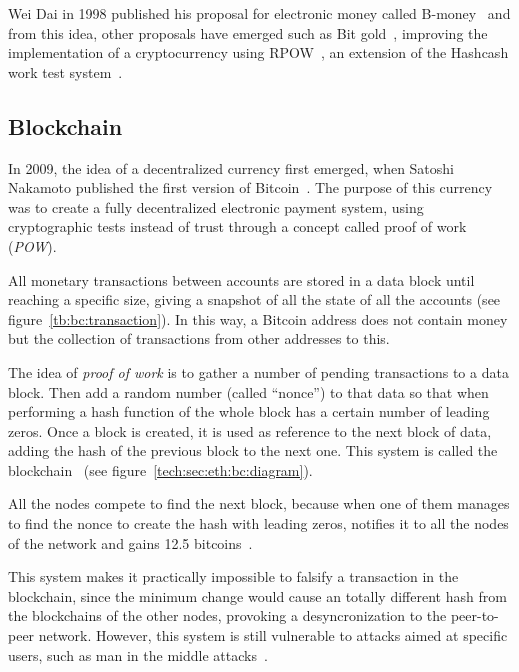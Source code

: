 Wei Dai in 1998 published his proposal for electronic money called
B-money~\cite{bmoney} and from this idea, other proposals have emerged such as
Bit gold~\cite{bitgold}, improving the implementation of a cryptocurrency using
RPOW~\cite{finney2005rpow}, an extension of the Hashcash work test
system~\cite{back2002hashcash}.

\subsection{Blockchain}
\label{tb:bc}


In 2009, the idea of a decentralized currency first emerged, when Satoshi
Nakamoto published the first version of Bitcoin~\cite{nakamoto2008bitcoin}. The
purpose of this currency was to create a fully decentralized electronic payment
system, using cryptographic tests instead of trust through a concept called
proof of work (\emph{POW}).

All monetary transactions between accounts are stored in a data block until
reaching a specific size, giving a snapshot of all the state of all the accounts
(see figure~\ref{tb:bc:transaction}). In this way, a Bitcoin address does not
contain money but the collection of transactions from other addresses to this.

The idea of \emph{proof of work} is to gather a number of pending transactions
to a data block. Then add a random number (called ``nonce'') to that data so
that when performing a hash function of the whole block has a certain number of
leading zeros. Once a block is created, it is used as reference to the next
block of data, adding the hash of the previous block to the next one. This
system is called the blockchain~\cite{antonopoulos2014mastering} (see
figure~\ref{tech:sec:eth:bc:diagram}).


All the nodes compete to find the next block, because when one of them manages
to find the nonce to create the hash with leading zeros, notifies it to all the
nodes of the network and gains 12.5 bitcoins~\cite{barber2012bitter}.

This system makes it practically impossible to falsify a transaction in the
blockchain, since the minimum change would cause an totally different hash from
the blockchains of the other nodes, provoking a desyncronization to the
peer-to-peer network. However, this system is still vulnerable to attacks aimed
at specific users, such as man in the middle attacks~\cite{moore2013beware}.


